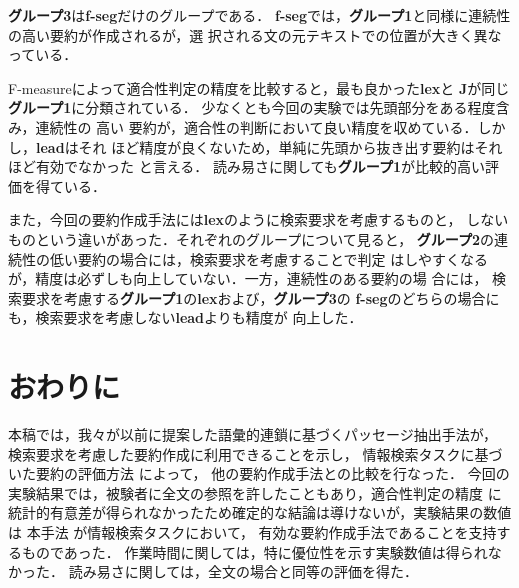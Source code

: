 {\bf グループ3}は{\bf f-seg}だけのグループである．
{\bf f-seg}では，{\bf グループ1}と同様に連続性の高い要約が作成されるが，選
択される文の元テキストでの位置が大きく異なっている．

F-measureによって適合性判定の精度を比較すると，最も良かった{\bf lex}と
{\bf J}が同じ{\bf グループ1}に分類されている．
少なくとも今回の実験では先頭部分をある程度含み，連続性の
高い
要約が，適合性の判断において良い精度を収めている．しかし，{\bf lead}はそれ
ほど精度が良くないため，単純に先頭から抜き出す要約はそれほど有効でなかった
と言える．
読み易さに関しても{\bf グループ1}が比較的高い評価を得ている．

また，今回の要約作成手法には{\bf lex}のように検索要求を考慮するものと，
しないものという違いがあった．それぞれのグループについて見ると，
{\bf グループ2}の連続性の低い要約の場合には，検索要求を考慮することで判定
はしやすくなるが，精度は必ずしも向上していない．一方，連続性のある要約の場
合には，
検索要求を考慮する{\bf グループ1}の{\bf lex}および，{\bf グループ3}の
 {\bf f-seg}のどちらの場合にも，検索要求を考慮しない{\bf lead}よりも精度が
向上した．

\section{おわりに}\label{sec:conc}
本稿では，我々が以前に提案した語彙的連鎖に基づくパッセージ抽出手法が，
検索要求を考慮した要約作成に利用できることを示し，
情報検索タスクに基づいた要約の評価方法
によって，
他の要約作成手法との比較を行なった．
今回の実験結果では，被験者に全文の参照を許したこともあり，適合性判定の精度
に統計的有意差が得られなかったため確定的な結論は導けないが，実験結果の数値
は
本手法
が情報検索タスクにおいて，
有効な要約作成手法であることを支持するものであった．
作業時間に関しては，特に優位性を示す実験数値は得られなかった．
読み易さに関しては，全文の場合と同等の評価を得た．



